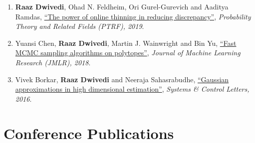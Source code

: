 \documentclass[margin,centered]{res}
\newcommand{\ptitle}[1]{``#1''}
\begin{document}
\begin{resume}
\begin{enumerate}[label={J\arabic*.},leftmargin=*]
\item \textbf{Raaz Dwivedi}\alpo, Ohad N. Feldheim, Ori Gurel-Gurevich and
Aaditya Ramdas, \href{https://link.springer.com/article/10.1007/s00440-018-0860-y}{\ptitle{The power of online thinning in reducing discrepancy}}, \emph{Probability Theory and Related Fields (PTRF), 2019}.
\item Yuansi Chen\eqc, \textbf{Raaz Dwivedi}\eqc, Martin
J. Wainwright and Bin Yu, \href{https://jmlr.org/papers/volume19/18-158/18-158.pdf} {\ptitle{Fast MCMC sampling algorithms on polytopes}}, \textit{Journal of Machine Learning Research (JMLR), 2018}. 
\item Vivek Borkar\alpo, \textbf{Raaz Dwivedi} and Neeraja Sahasrabudhe,
\href{https://www.sciencedirect.com/science/article/abs/pii/S016769111600058X}{
\ptitle{Gaussian approximations in high dimensional estimation}},
\emph{Systems \& Control Letters, 2016}.
\end{enumerate}




\section{\sc Conference Publications}


\end{resume}
\end{document}
